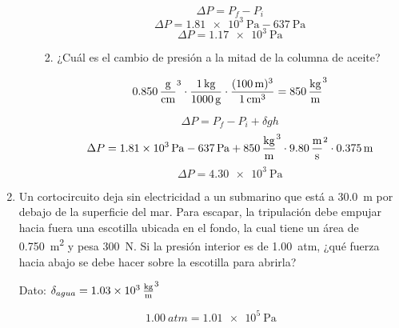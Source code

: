 \documentclass[Análisis.root.tex]{subfiles}
\begin{document}
\begin{enumerate}
\begin{enumerate}
\begin{enumerate}
                        \[\Delta P=P_f-P_i\]
                        \[\Delta P=\SI{1,81e3}{\pascal}-\SI{637}{\pascal}\]
                        \[\Delta P=\boxed{\SI{1,17e3}{\pascal}}\]

                  \item ¿Cuál es el cambio de presión a la mitad de la columna de aceite?

                        \[\SI{0,850}{\gram\over\centi\meter\cubed}\cdot\frac{\SI{1}{\kilogram}}{\SI{1000}{\gram}}\cdot\frac{(\SI{100}{\meter})^3}{\SI{1}{\cm\cubed}}=\SI{850}{\kilogram\over\meter\cubed}\]

                        \[\Delta P=P_f-P_i+\delta gh\]
                        \[\Delta P=\SI{1,81e3}{\pascal}-\SI{637}{\pascal}+\SI{850}{\kilogram\over\meter\cubed}\cdot\SI{9,80}{\meter\over\second\squared}\cdot\SI{0,375}{\meter}\]
                        \[\Delta P=\boxed{\SI{4,30e3}{\pascal}}\]
                \end{enumerate}
        \end{enumerate}

  \item Un cortocircuito deja sin electricidad a un submarino que está a \SI{30,0}{\meter} por debajo de la superficie del mar. Para escapar, la tripulación debe empujar hacia fuera una escotilla ubicada en el fondo, la cual tiene un área de \SI{0,750}{\meter\squared} y pesa \SI{300}{\newton}. Si la presión interior es de \SI{1,00}{atm}, ¿qué fuerza hacia abajo se debe hacer sobre la escotilla para abrirla?

        Dato: $\delta_{agua}=\SI{1,03e3}{\kilogram\over\meter\cubed}$

        \begin{center}
        \end{center}

        \[\SI{1,00}{atm}=\SI{1,01e5}{\pascal}\]


\end{enumerate}
\end{document}
